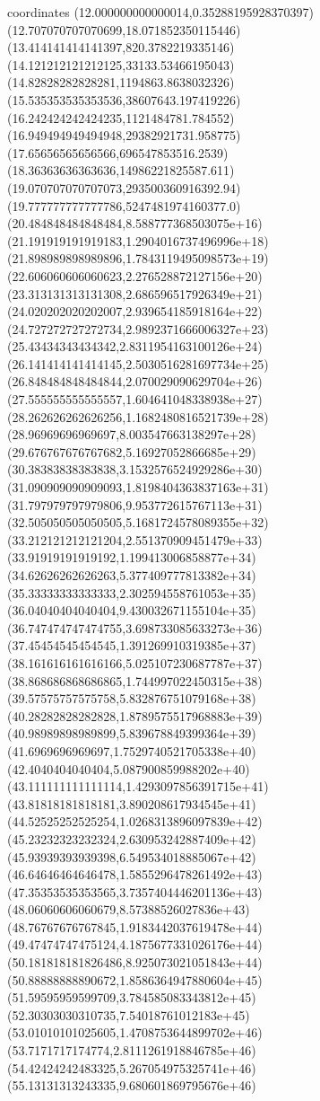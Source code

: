 coordinates {%
(12.000000000000014,0.35288195928370397)
(12.707070707070699,18.071852350115446)
(13.414141414141397,820.3782219335146)
(14.121212121212125,33133.53466195043)
(14.82828282828281,1194863.8638032326)
(15.535353535353536,38607643.197419226)
(16.242424242424235,1121484781.784552)
(16.949494949494948,29382921731.958775)
(17.65656565656566,696547853516.2539)
(18.36363636363636,14986221825587.611)
(19.070707070707073,293500360916392.94)
(19.777777777777786,5247481974160377.0)
(20.484848484848484,8.588777368503075e+16)
(21.191919191919183,1.2904016737496996e+18)
(21.898989898989896,1.7843119495098573e+19)
(22.606060606060623,2.276528872127156e+20)
(23.313131313131308,2.686596517926349e+21)
(24.020202020202007,2.939654185918164e+22)
(24.727272727272734,2.9892371666006327e+23)
(25.43434343434342,2.8311954163100126e+24)
(26.141414141414145,2.5030516281697734e+25)
(26.848484848484844,2.070029090629704e+26)
(27.555555555555557,1.604641048338938e+27)
(28.262626262626256,1.1682480816521739e+28)
(28.96969696969697,8.003547663138297e+28)
(29.676767676767682,5.16927052866685e+29)
(30.38383838383838,3.1532576524929286e+30)
(31.090909090909093,1.8198404363837163e+31)
(31.797979797979806,9.953772615767113e+31)
(32.505050505050505,5.1681724578089355e+32)
(33.212121212121204,2.551370909451479e+33)
(33.91919191919192,1.199413006858877e+34)
(34.62626262626263,5.377409777813382e+34)
(35.33333333333333,2.302594558761053e+35)
(36.04040404040404,9.430032671155104e+35)
(36.747474747474755,3.698733085633273e+36)
(37.45454545454545,1.391269910319385e+37)
(38.161616161616166,5.025107230687787e+37)
(38.868686868686865,1.744997022450315e+38)
(39.57575757575758,5.832876751079168e+38)
(40.28282828282828,1.8789575517968883e+39)
(40.98989898989899,5.839678849399364e+39)
(41.6969696969697,1.7529740521705338e+40)
(42.4040404040404,5.087900859988202e+40)
(43.111111111111114,1.4293097856391715e+41)
(43.81818181818181,3.890208617934545e+41)
(44.52525252525254,1.0268313896097839e+42)
(45.23232323232324,2.630953242887409e+42)
(45.93939393939398,6.549534018885067e+42)
(46.64646464646478,1.5855296478261492e+43)
(47.35353535353565,3.7357404446201136e+43)
(48.06060606060679,8.57388526027836e+43)
(48.76767676767845,1.9183442037619478e+44)
(49.47474747475124,4.1875677331026176e+44)
(50.181818181826486,8.925073021051843e+44)
(50.88888888890672,1.8586364947880604e+45)
(51.59595959599709,3.784585083343812e+45)
(52.30303030310735,7.54018761012183e+45)
(53.01010101025605,1.4708753644899702e+46)
(53.7171717174774,2.8111261918846785e+46)
(54.42424242483325,5.267054975325741e+46)
(55.13131313243335,9.680601869795676e+46)
}

